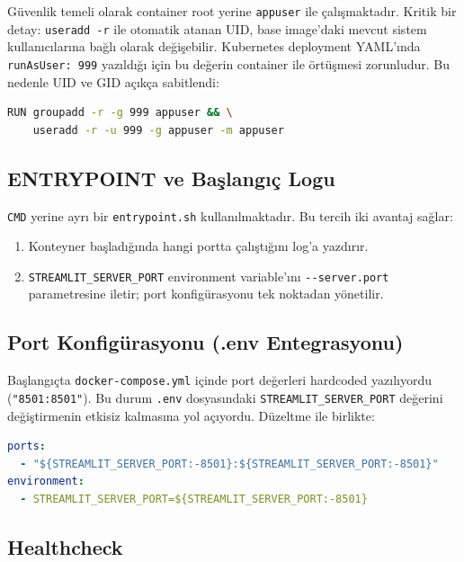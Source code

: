 \documentclass[12pt,a4paper]{article}
\begin{document}
Güvenlik temeli olarak container root yerine \texttt{appuser} ile
çalışmaktadır. Kritik bir detay: \texttt{useradd -r} ile otomatik
atanan UID, base image'daki mevcut sistem kullanıcılarına bağlı
olarak değişebilir. Kubernetes deployment YAML'ında
\texttt{runAsUser: 999} yazıldığı için bu değerin container ile
örtüşmesi zorunludur. Bu nedenle UID ve GID açıkça sabitlendi:

\begin{lstlisting}[language=bash]
RUN groupadd -r -g 999 appuser && \
    useradd -r -u 999 -g appuser -m appuser
\end{lstlisting}

\subsection{ENTRYPOINT ve Başlangıç Logu}

\texttt{CMD} yerine ayrı bir \texttt{entrypoint.sh} kullanılmaktadır.
Bu tercih iki avantaj sağlar:

\begin{enumerate}[leftmargin=*]
  \item Konteyner başladığında hangi portta çalıştığını log'a yazdırır.
  \item \texttt{STREAMLIT\_SERVER\_PORT} environment variable'ını
        \texttt{-{}-server.port} parametresine iletir; port konfigürasyonu
        tek noktadan yönetilir.
\end{enumerate}

\subsection{Port Konfigürasyonu (.env Entegrasyonu)}

Başlangıçta \texttt{docker-compose.yml} içinde port değerleri
hardcoded yazılıyordu (\texttt{"8501:8501"}). Bu durum
\texttt{.env} dosyasındaki \texttt{STREAMLIT\_SERVER\_PORT}
değerini değiştirmenin etkisiz kalmasına yol açıyordu.
Düzeltme ile birlikte:

\begin{lstlisting}[language=yaml]
ports:
  - "${STREAMLIT_SERVER_PORT:-8501}:${STREAMLIT_SERVER_PORT:-8501}"
environment:
  - STREAMLIT_SERVER_PORT=${STREAMLIT_SERVER_PORT:-8501}
\end{lstlisting}

\subsection{Healthcheck}
\end{document}
